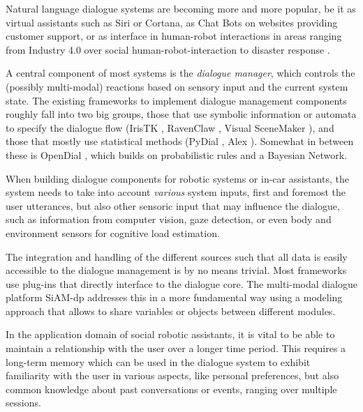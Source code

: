 
Natural language dialogue systems are becoming more and more popular, be it as
virtual assistants such as Siri or Cortana, as Chat Bots on websites providing
customer support, or as interface in human-robot interactions in areas ranging
from Industry 4.0 \citep{schwartz2016hybrid} over social human-robot-interaction
\citep{alize2010} to disaster response \citep{kruijff2015tradr}.

A central component of most systems is the \emph{dialogue manager}, which
controls the (possibly multi-modal) reactions based on sensory input and the
current system state. The existing frameworks to implement dialogue management
components roughly fall into two big groups, those that use symbolic
information or automata to specify the dialogue flow (IrisTK
\citep{2012iristk}, RavenClaw \citep{bohus2009ravenclaw}, Visual SceneMaker
\citep{gebhard2012visual}), and those that mostly use statistical methods
(PyDial \cite{ultes2017pydial}, Alex \citep{jurvcivcek2014alex}). Somewhat in
between these is OpenDial \citep{lison2015developing}, which builds on
probabilistic rules and a Bayesian Network.

When building dialogue components for robotic systems or in-car assistants, the system
needs to take into account \emph{various} system inputs, first and foremost the
user utterances, but also other sensoric input that may influence the dialogue,
such as information from computer vision, gaze detection, or even body and
environment sensors for cognitive load estimation.

The integration and handling of the different sources such that all data is
easily accessible to the dialogue management is by no means trivial. Most
frameworks use plug-ins that directly interface to the dialogue core. The
multi-modal dialogue platform SiAM-dp \citep{nesselrath2014siam}
addresses this in a more fundamental way using a modeling approach that allows
to share variables or objects between different modules.

In the application domain of social robotic assistants, it is vital to be able
to maintain a relationship with the user over a longer time period. This requires a long-term
memory which can be used in the dialogue system to exhibit familiarity with the
user in various aspects, like personal preferences, but also common knowledge
about past conversations or events, ranging over multiple sessions.

